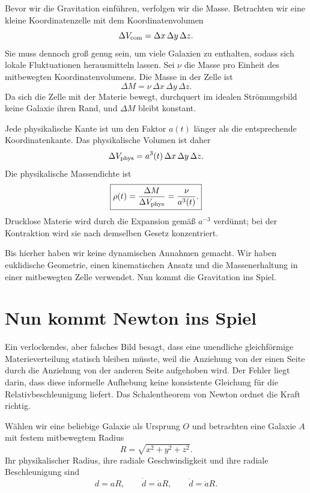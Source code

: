 Bevor wir die Gravitation einführen, verfolgen wir die Masse. Betrachten wir eine kleine Koordinatenzelle mit dem Koordinatenvolumen
\begin{equation}
\Delta V_{\rm com}=\Delta x\,\Delta y\,\Delta z.
\end{equation}
Sie muss dennoch groß genug sein, um viele Galaxien zu enthalten, sodass sich lokale Fluktuationen herausmitteln lassen. Sei \(\nu\) die Masse pro Einheit des mitbewegten Koordinatenvolumens. Die Masse in der Zelle ist
\begin{equation}
\Delta M=\nu\,\Delta x\,\Delta y\,\Delta z.
\label{eq:c01-comoving-mass}
\end{equation}
Da sich die Zelle mit der Materie bewegt, durchquert im idealen Strömungsbild keine Galaxie ihren Rand, und \(\Delta M\) bleibt konstant.

Jede physikalische Kante ist um den Faktor \(a(t)\) länger als die entsprechende Koordinatenkante. Das physikalische Volumen ist daher
\begin{equation}
\Delta V_{\rm phys}=a^3(t)\,\Delta x\,\Delta y\,\Delta z.
\end{equation}
Die physikalische Massendichte ist
\begin{equation}
\boxed{\rho(t)=\frac{\Delta M}{\Delta V_{\rm phys}}=\frac{\nu}{a^3(t)}.}
\label{eq:c01-density-dilution}
\end{equation}
Drucklose Materie wird durch die Expansion gemäß \(a^{-3}\) verdünnt; bei der Kontraktion wird sie nach demselben Gesetz konzentriert.

Bis hierher haben wir keine dynamischen Annahmen gemacht. Wir haben euklidische Geometrie, einen kinematischen Ansatz und die Massenerhaltung in einer mitbewegten Zelle verwendet. Nun kommt die Gravitation ins Spiel.

\section{Nun kommt Newton ins Spiel}

Ein verlockendes, aber falsches Bild besagt, dass eine unendliche gleichförmige Materieverteilung statisch bleiben müsste, weil die Anziehung von der einen Seite durch die Anziehung von der anderen Seite aufgehoben wird. Der Fehler liegt darin, dass diese informelle Aufhebung keine konsistente Gleichung für die Relativbeschleunigung liefert. Das Schalentheorem von Newton ordnet die Kraft richtig.

Wählen wir eine beliebige Galaxie als Ursprung \(O\) und betrachten eine Galaxie \(A\) mit festem mitbewegtem Radius
\begin{equation}
R=\sqrt{x^2+y^2+z^2}.
\end{equation}
Ihr physikalischer Radius, ihre radiale Geschwindigkeit und ihre radiale Beschleunigung sind
\begin{equation}
d=aR,
\qquad
\dot d=\dot a R,
\qquad
\ddot d=\ddot a R.
\label{eq:c01-radial-kinematics}
\end{equation}

